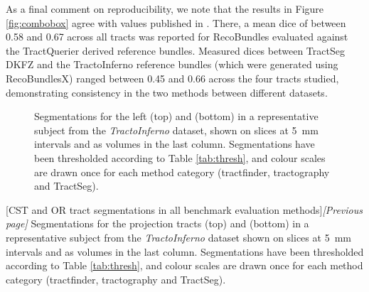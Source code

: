As a final comment on reproducibility, we note that the results in Figure \ref{fig:combobox} agree with values published in \textcite{Wasserthal2018}.
There, a mean \gls{dice} of between 0.58 and 0.67 across all tracts was reported for RecoBundles evaluated against the TractQuerier derived reference bundles.
Measured \glspl{dice} between TractSeg DKFZ and the TractoInferno reference bundles (which were generated using RecoBundlesX) ranged between 0.45 and 0.66 across the four tracts studied, demonstrating consistency in the two methods between different datasets.

\begin{figure}[hp!]
  \begin{subfigure}{\textwidth}
    \makebox[\linewidth][r]{%
    }
  \end{subfigure}
  \begin{subfigure}{\textwidth}
    \makebox[\linewidth][r]{%
    }
  \end{subfigure}
  \caption[AF and IFOF tract segmentations in all benchmark evaluation methods]{Segmentations for the left  (top) and  (bottom) in a representative subject from the \textit{TractoInferno} dataset, shown on slices at 5~mm intervals and as volumes in the last column. Segmentations have been thresholded according to Table \ref{tab:thresh}, and colour scales are drawn once for each method category (tractfinder, tractography and TractSeg).}
  \label{fig:lb.afifof}
\end{figure}
\begin{figure}[htb!]
  \centering
  \begin{subfigure}{\textwidth}
    \makebox[\linewidth][r]{%
    }
  \end{subfigure}
  \begin{subfigure}{\textwidth}
    \makebox[\linewidth][r]{%
    }
  \end{subfigure}
\end{figure}
\clearpage\addtocounter{figure}{-1} %
{[CST and OR tract segmentations in all benchmark evaluation methods]{\textit{[Previous page]} Segmentations for the projection tracts  (top) and  (bottom) in a representative subject from the \textit{TractoInferno} dataset shown on slices at 5~mm intervals and as volumes in the last column. Segmentations have been thresholded according to Table \ref{tab:thresh}, and colour scales are drawn once for each method category (tractfinder, tractography and TractSeg). \label{fig:lb.cstor}}
}

